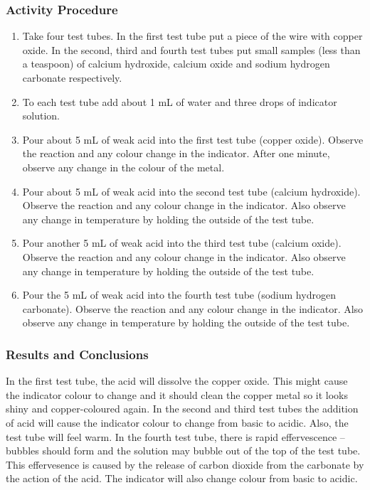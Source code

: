 \subsubsection*{Activity Procedure}
\begin{enumerate}
\item{Take four test tubes. In the first test tube put a piece of the wire with copper oxide. In the second, third and fourth test tubes put small samples (less than a teaspoon) of calcium hydroxide, calcium oxide and sodium hydrogen carbonate respectively.}
\item{To each test tube add about 1 mL of water and three drops of indicator solution.}
\item{Pour about 5 mL of weak acid into the first test tube (copper oxide). Observe the reaction and any colour change in the indicator. After one minute, observe any change in the colour of the metal.}
\item{Pour about 5 mL of weak acid into the second test tube (calcium hydroxide). Observe the reaction and any colour change in the indicator. Also observe any change in temperature by holding the outside of the test tube.}
\item{Pour another 5 mL of weak acid into the third test tube (calcium oxide). Observe the reaction and any colour change in the indicator. Also observe any change in temperature by holding the outside of the test tube.}
\item{Pour the 5 mL of weak acid into the fourth test tube (sodium hydrogen carbonate). Observe the reaction and any colour change in the indicator. Also observe any change in temperature by holding the outside of the test tube.}
\end{enumerate}

\subsubsection*{Results and Conclusions}
In the first test tube, the acid will dissolve the copper oxide. This might cause the indicator colour to change and it should clean the copper metal so it looks shiny and copper-coloured again.
In the second and third test tubes the addition of acid will cause the indicator colour to change from basic to acidic. Also, the test tube will feel warm.
In the fourth test tube, there is rapid effervescence -- bubbles should form and the solution may bubble out of the top of the test tube. This effervesence is caused by the release of carbon dioxide from the carbonate by the action of the acid. The indicator will also change colour from basic to acidic.

